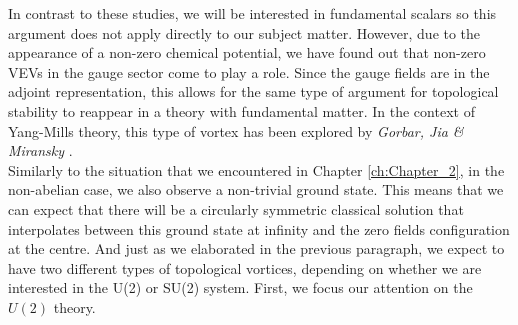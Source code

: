 In contrast to these studies, we will be interested in fundamental scalars so this argument does not apply directly to our subject matter. However, due to the appearance of a non-zero chemical potential, we have found out that non-zero VEVs in the gauge sector come to play a role. Since the gauge fields are in the adjoint representation, this allows for the same type of argument for topological stability to reappear in a theory with fundamental matter. In the context of Yang-Mills theory, this type of vortex has been explored by \textit{Gorbar, Jia \& Miransky} \cite{Gorbar:2005pi}.\\  
\indent Similarly to the situation that we encountered in Chapter \ref{ch:Chapter_2}, in the non-abelian case, we also observe a non-trivial ground state. This means that we can expect that there will be a circularly symmetric classical solution that interpolates between this ground state at infinity and the zero fields configuration at the centre. And just as we elaborated in the previous paragraph, we expect to have two different types of topological vortices, depending on whether we are interested in the U(2) or SU(2) system. First, we focus our attention on the $U(2)$ theory.



